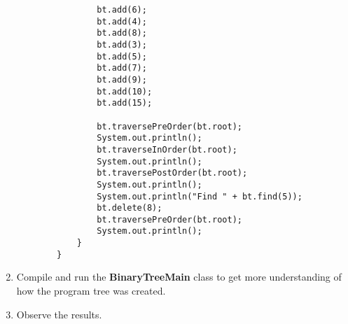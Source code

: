 \documentclass[12pt,titlepage]{article}
\begin{document}
\begin{enumerate}
\begin{verbatim}
                bt.add(6);
                bt.add(4);
                bt.add(8);
                bt.add(3);
                bt.add(5);
                bt.add(7);
                bt.add(9);
                bt.add(10);
                bt.add(15);

                bt.traversePreOrder(bt.root);
                System.out.println();
                bt.traverseInOrder(bt.root);
                System.out.println();
                bt.traversePostOrder(bt.root);
                System.out.println();
                System.out.println("Find " + bt.find(5));
                bt.delete(8);
                bt.traversePreOrder(bt.root);
                System.out.println();
            }
        }
    \end{verbatim}
    \item Compile and run the \textbf{BinaryTreeMain} class to get more understanding of how the program tree was created.
    \item Observe the results.
\end{enumerate}
\end{document}
